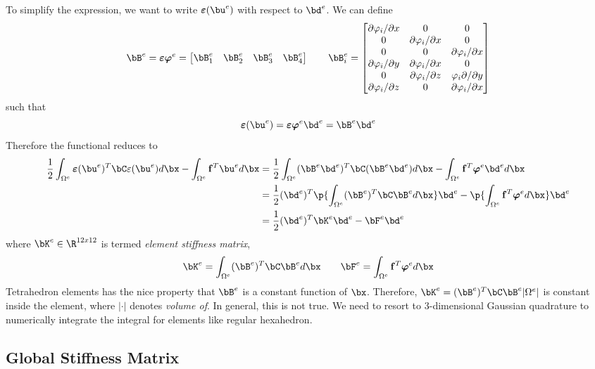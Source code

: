 \documentclass[11pt,titlepage]{article}
\newcommand{\bepsilon}{\boldsymbol{\varepsilon}}
\renewcommand{\epsilon}{\varepsilon}
\renewcommand{\bf}{\mathbf{f}}
\renewcommand{\bphi}{\boldsymbol{\varphi}}
\begin{document}
To simplify the expression, we want to write $\bepsilon(\bu^e)$ with respect to $\bd^e$. We can define 
\[
    \bB^e
    = \bepsilon \bphi^e
    = 
    \begin{bmatrix}
    \bB^e_1 & \bB^e_2 & \bB^e_3 & \bB^e_4 
    \end{bmatrix}
    \quad\quad
    \bB^e_i = 
    \begin{bmatrix}
        \partial \varphi_i / \partial x & 0 & 0 \\
        0 & \partial \varphi_i / \partial x & 0 \\
        0 & 0 & \partial \varphi_i / \partial x \\
        \partial \varphi_i / \partial y & \partial \varphi_i /\partial x & 0 \\
        0 & \partial \varphi_i / \partial z & \varphi_i \partial /\partial y \\
        \partial \varphi_i/ \partial z & 0 & \partial \varphi_i /\partial x \\
    \end{bmatrix}
\]
such that 
\[
    \bepsilon(\bu^e) = \bepsilon \bphi^e \bd^e = \bB^e \bd^e
\]
Therefore the functional reduces to 
\begin{align*}
    \frac{1}{2} \int_{\Omega^e} \bepsilon(\bu^e)^T \bC \epsilon(\bu^e) d\bx
    - \int_{\Omega^e} \bf^T \bu^e d\bx
    &= 
    \frac{1}{2} \int_{\Omega^e} (\bB^e\bd^e)^T \bC (\bB^e\bd^e) d\bx
    - \int_{\Omega^e} \bf^T \bphi^e\bd^e d\bx \\
    &=
    \frac{1}{2} (\bd^e)^T \p{\int_{\Omega^e} (\bB^e)^T \bC \bB^e d\bx} \bd^e
    - \p{ \int_{\Omega^e} \bf^T \bphi^e d\bx } \bd^e \\
    &= \frac{1}{2} (\bd^e)^T \bK^e \bd^e
    - \bF^e \bd^e
\end{align*}
where $\bK^e \in \R^{12x12}$ is termed \textit{element stiffness matrix},
\[
    \bK^e = \int_{\Omega^e} (\bB^e)^T \bC \bB^e d\bx
    \quad\quad
    \bF^e = \int_{\Omega^e} \bf^T \bphi^e d\bx
\]
Tetrahedron elements has the nice property that $\bB^e$ is a constant function of $\bx$. Therefore, $\bK^e = (\bB^e)^T \bC \bB^e |\Omega^e|$ is constant inside the element, where $|\cdot|$ denotes \textit{volume of}. In general, this is not true. We need to resort to 3-dimensional Gaussian quadrature to numerically integrate the integral for elements like regular hexahedron.


\subsection{Global Stiffness Matrix}
\end{document}
